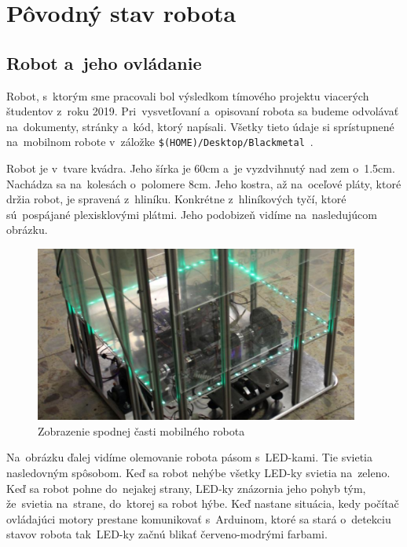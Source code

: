 \section{Pôvodný stav robota}

\subsection{Robot a~jeho ovládanie}

Robot, s~ktorým sme pracovali bol výsledkom tímového projektu viacerých študentov \newline z~roku 2019. Pri~vysvetľovaní a~opisovaní robota sa budeme
odvolávať na~dokumenty, stránky a~kód, ktorý napísali. Všetky tieto údaje si sprístupnené na~mobilnom robote v~záložke
\newline \texttt{\$(HOME)/Desktop/Blackmetal}~\cite{timovyProjekt}.

Robot je v~tvare kvádra. Jeho šírka je 60cm a~je vyzdvihnutý nad zem o~1.5cm. Nachádza sa na~kolesách o~polomere 8cm. Jeho kostra, až na~oceľové pláty,
ktoré držia robot, je spravená z~hliníku. Konkrétne z~hliníkových tyčí, ktoré sú~pospájané plexisklovými plátmi. Jeho podobizeň vidíme na~nasledujúcom
obrázku.

\begin{figure}[!htbp]
	\begin{center}
		\includegraphics[width=0.95\textwidth]{img/robot.png}
	\end{center}
	\caption{Zobrazenie spodnej časti mobilného robota~\cite{timovyProjekt}}
	\label{fig:robot}
\end{figure}

\noindent Na~obrázku ďalej vidíme olemovanie robota pásom s~LED-kami. Tie svietia nasledovným spôsobom. Keď sa robot nehýbe všetky LED-ky svietia
na~zeleno. Keď sa robot pohne do~nejakej strany, LED-ky znázornia jeho pohyb tým, že~svietia na~strane, do~ktorej sa robot hýbe. Keď nastane
situácia, kedy počítač ovládajúci motory prestane komunikovať s~Arduinom, ktoré sa stará o~detekciu stavov robota tak~LED-ky začnú blikať
červeno-modrými farbami.

